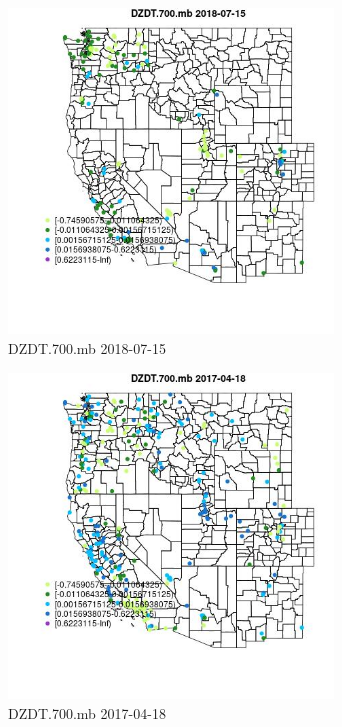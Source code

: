 \begin{figure} 
\centering  
\includegraphics[width=0.77\textwidth]{Code_Outputs/Report_ML_input_PM25_Step4_part_e_de_duplicated_aves_compiled_2019-05-21wNAs_MapObsDZDT700mb2018-07-15.jpg} 
\caption{\label{fig:Report_ML_input_PM25_Step4_part_e_de_duplicated_aves_compiled_2019-05-21wNAsMapObsDZDT700mb2018-07-15}DZDT.700.mb 2018-07-15} 
\end{figure} 
 

\begin{figure} 
\centering  
\includegraphics[width=0.77\textwidth]{Code_Outputs/Report_ML_input_PM25_Step4_part_e_de_duplicated_aves_compiled_2019-05-21wNAs_MapObsDZDT700mb2017-04-18.jpg} 
\caption{\label{fig:Report_ML_input_PM25_Step4_part_e_de_duplicated_aves_compiled_2019-05-21wNAsMapObsDZDT700mb2017-04-18}DZDT.700.mb 2017-04-18} 
\end{figure} 
 

